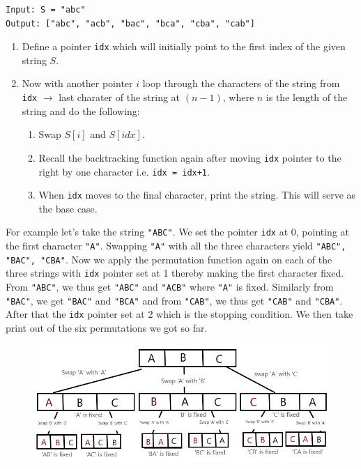 \documentclass[a4paper,11pt]{book}
\begin{document}
\begin{lstlisting}
Input: S = "abc"
Output: ["abc", "acb", "bac", "bca", "cba", "cab"]
\end{lstlisting}

\begin{enumerate}
\item Define a pointer \lstinline{idx} which will initially point to the first index of the given string $S$.
\item Now with another pointer $i$ loop through the characters of the string from \lstinline{idx} $\rightarrow$ last charater of the string at $(n-1)$, where $n$ is the length of the string and do the following:
\begin{enumerate}
    \item Swap $S[i]$ and $S[idx]$.
    \item Recall the backtracking function again after moving \lstinline{idx} pointer to the right by one character i.e. \lstinline{idx = idx+1}.
\item When \lstinline{idx} moves to the final character, print the string. This will serve as the base case.
\end{enumerate}
\end{enumerate}

\noindent For example let's take the string \lstinline{"ABC"}. We set the pointer \lstinline{idx} at 0, pointing at the first character \lstinline{"A"}. Swapping \lstinline{"A"} with all the three characters yield \lstinline{"ABC", "BAC", "CBA"}. Now we apply the permutation function again on each of the three strings with \lstinline{idx} pointer set at 1 thereby making the first character fixed. From \lstinline{"ABC"}, we thus get \lstinline{"ABC"} and \lstinline{"ACB"} where \lstinline{"A"} is fixed. Similarly from \lstinline{"BAC"}, we get \lstinline{"BAC"} and \lstinline{"BCA"} and from \lstinline{"CAB"}, we thus get \lstinline{"CAB"} and \lstinline{"CBA"}. After that the \lstinline{idx} pointer set at 2 which is the stopping condition. We then take print out of the six permutations we got so far.
\begin{figure}[ht]
	\centering
	\includegraphics[scale=0.45]{code/sort/pic/recursiontreeabc.png}
\end{figure}
\vspace{5mm}
\end{document}
